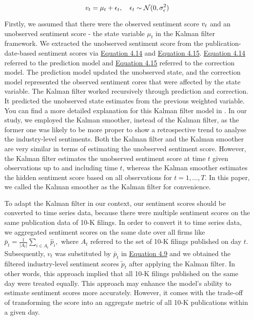 \documentclass[logo,bsc,singlespacing,parskip]{infthesis}
\begin{document}
\begin{equation} \label{4.15}
\\v_t = \mu_t + \epsilon_t, \quad \epsilon_t \sim \mathcal{N}(0, \sigma_{\epsilon}^2)
\end{equation}

Firstly, we assumed that there were the observed sentiment score $\\v_t$ and an unobserved sentiment score - the state variable $\mu_t$ in the Kalman filter framework. We extracted the unobserved sentiment score from the publication-date-based sentiment scores via \hyperref[4.14]{Equation 4.14} and \hyperref[4.15]{Equation 4.15}. \hyperref[4.14]{Equation 4.14} referred to the prediction model and \hyperref[4.15]{Equation 4.15} referred to the correction model. The prediction model updated the unobserved state, and the correction model represented the observed sentiment cores that were affected by the state variable. The Kalman filter worked recursively through prediction and correction. It predicted the unobserved state estimates from the previous weighted variable. You can find a more detailed explanation for this Kalman filter model in \cite{durbin2012time}. In our study, we employed the Kalman smoother, instead of the Kalman filter, as the former one was likely to be more proper to show a retrospective trend to analyse the industry-level sentiments. Both the Kalman filter and the Kalman smoother are very similar in terms of estimating the unobserved sentiment score. However, the Kalman filter estimates the unobserved sentiment score at time $t$ given observations up to and including time $t$, whereas the Kalman smoother estimates the hidden sentiment score based on all observations for $t = 1,..., T$. In this paper, we called the Kalman smoother as the Kalman filter for convenience.   

To adapt the Kalman filter in our context, our sentiment scores should be converted to time series data, because there were multiple sentiment scores on the same publication data of 10-K filings. In order to convert it to time series data, we aggregated sentiment scores on the same date over all firms like $\bar{p}_t = \frac{1}{|A_t|} \sum_{i \in A_t} \hat{p}_i,$ where $A_t$ referred to the set of 10-K filings published on day $t$. Subsequently, $v_t$ was substituted by $\bar{p}_t$ in \hyperref[4.9]{Equation 4.9} and we obtained the filtered industry-level sentiment scores $\tilde{p}_t$ after applying the Kalman filter. In other words, this approach implied that all 10-K filings published on the same day were treated equally. This approach may enhance the model's ability to estimate sentiment scores more accurately. However, it comes with the trade-off of transforming the score into an aggregate metric of all 10-K publications within a given day.
\end{document}
